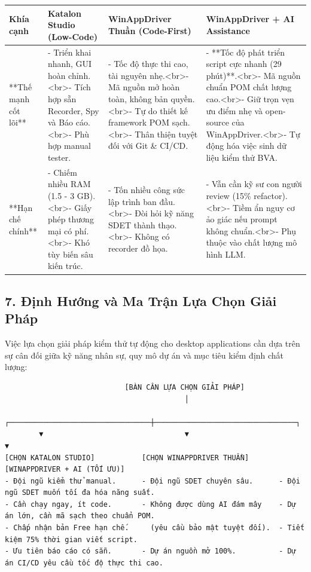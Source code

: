 \begin{table}[H]
\centering
\begin{tabular}{|l|l|l|l|}
\hline
\textbf{Khía cạnh} & \textbf{Katalon Studio (Low-Code)} & \textbf{WinAppDriver Thuần (Code-First)} & \textbf{WinAppDriver + AI Assistance} \\ \hline
**Thế mạnh cốt lõi** & - Triển khai nhanh, GUI hoàn chỉnh.<br>- Tích hợp sẵn Recorder, Spy và Báo cáo.<br>- Phù hợp manual tester. & - Tốc độ thực thi cao, tài nguyên nhẹ.<br>- Mã nguồn mở hoàn toàn, không bản quyền.<br>- Tự do thiết kế framework POM sạch.<br>- Thân thiện tuyệt đối với Git \& CI/CD. & - **Tốc độ phát triển script cực nhanh (29 phút)**.<br>- Mã nguồn chuẩn POM chất lượng cao.<br>- Giữ trọn vẹn ưu điểm nhẹ và open-source của WinAppDriver.<br>- Tự động hóa việc sinh dữ liệu kiểm thử BVA. \\ \hline
**Hạn chế chính** & - Chiếm nhiều RAM (1.5 - 3 GB).<br>- Giấy phép thương mại có phí.<br>- Khó tùy biến sâu kiến trúc. & - Tốn nhiều công sức lập trình ban đầu.<br>- Đòi hỏi kỹ năng SDET thành thạo.<br>- Không có recorder đồ họa. & - Vẫn cần kỹ sư con người review (15\% refactor).<br>- Tiềm ẩn nguy cơ ảo giác nếu prompt không chuẩn.<br>- Phụ thuộc vào chất lượng mô hình LLM. \\ \hline
\end{tabular}
\end{table}





\subsection{7. Định Hướng và Ma Trận Lựa Chọn Giải Pháp}

Việc lựa chọn giải pháp kiểm thử tự động cho desktop applications cần dựa trên sự cân đối giữa kỹ năng nhân sự, quy mô dự án và mục tiêu kiểm định chất lượng:

\begin{lstlisting}
                            [BÀN CÂN LỰA CHỌN GIẢI PHÁP]
                                          │
        ┌─────────────────────────────────┼─────────────────────────────────┐
        ▼                                 ▼                                 ▼
[CHỌN KATALON STUDIO]           [CHỌN WINAPPDRIVER THUẦN]       [WINAPPDRIVER + AI (TỐI ƯU)]
- Đội ngũ kiểm thử manual.      - Đội ngũ SDET chuyên sâu.      - Đội ngũ SDET muốn tối đa hóa năng suất.
- Cần chạy ngay, ít code.       - Không được dùng AI đám mây    - Dự án lớn, cần mã sạch theo chuẩn POM.
- Chấp nhận bản Free hạn chế.     (yêu cầu bảo mật tuyệt đối).  - Tiết kiệm 75% thời gian viết script.
- Ưu tiên báo cáo có sẵn.       - Dự án nguồn mở 100%.          - Dự án CI/CD yêu cầu tốc độ thực thi cao.
\end{lstlisting}


